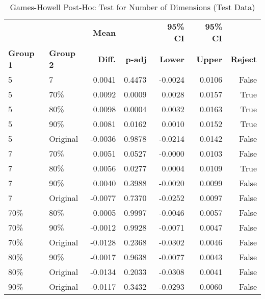 \begin{table}[h!]
    \captionsetup{skip=5pt}
\centering
\caption{Games-Howell Post-Hoc Test for Number of Dimensions (Test Data)}
\label{tbl:games_howell_num_dim}
        \begin{tabular}{llrrrrr}
            \toprule
             &  & \textbf{Mean} &  & \textbf{95\% CI} & \textbf{95\% CI} & \\
            \textbf{Group 1} & \textbf{Group 2} & \textbf{Diff.} & \textbf{p-adj} & \textbf{Lower} & \textbf{Upper} & \textbf{Reject}\\
\midrule
5 & 7 & 0.0041 & 0.4473 & -0.0024 & 0.0106 & False \\
5 & 70\% & 0.0092 & 0.0009 & 0.0028 & 0.0157 & True \\
5 & 80\% & 0.0098 & 0.0004 & 0.0032 & 0.0163 & True \\
5 & 90\% & 0.0081 & 0.0162 & 0.0010 & 0.0152 & True \\
5 & Original & -0.0036 & 0.9878 & -0.0214 & 0.0142 & False \\
7 & 70\% & 0.0051 & 0.0527 & -0.0000 & 0.0103 & False \\
7 & 80\% & 0.0056 & 0.0277 & 0.0004 & 0.0109 & True \\
7 & 90\% & 0.0040 & 0.3988 & -0.0020 & 0.0099 & False \\
7 & Original & -0.0077 & 0.7370 & -0.0252 & 0.0097 & False \\
70\% & 80\% & 0.0005 & 0.9997 & -0.0046 & 0.0057 & False \\
70\% & 90\% & -0.0012 & 0.9928 & -0.0071 & 0.0047 & False \\
70\% & Original & -0.0128 & 0.2368 & -0.0302 & 0.0046 & False \\
80\% & 90\% & -0.0017 & 0.9638 & -0.0077 & 0.0043 & False \\
80\% & Original & -0.0134 & 0.2033 & -0.0308 & 0.0041 & False \\
90\% & Original & -0.0117 & 0.3432 & -0.0293 & 0.0060 & False \\
\bottomrule
\end{tabular}
\end{table}

